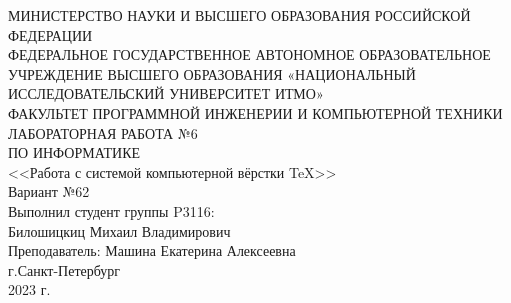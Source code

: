 \begin{titlepage}
    \centering
    \large МИНИСТЕРСТВО НАУКИ И ВЫСШЕГО ОБРАЗОВАНИЯ РОССИЙСКОЙ ФЕДЕРАЦИИ\\ФЕДЕРАЛЬНОЕ ГОСУДАРСТВЕННОЕ АВТОНОМНОЕ ОБРАЗОВАТЕЛЬНОЕ УЧРЕЖДЕНИЕ ВЫСШЕГО ОБРАЗОВАНИЯ «НАЦИОНАЛЬНЫЙ ИССЛЕДОВАТЕЛЬСКИЙ УНИВЕРСИТЕТ ИТМО»\\ФАКУЛЬТЕТ ПРОГРАММНОЙ ИНЖЕНЕРИИ И КОМПЬЮТЕРНОЙ ТЕХНИКИ\\
    \vspace*{\fill}
    \LARGE ЛАБОРАТОРНАЯ РАБОТА №6\\ПО ИНФОРМАТИКЕ\\<<Работа с системой компьютерной вёрстки \TeX>>\\Вариант №62\\
    \vspace{2cm}
    \raggedleft \large Выполнил студент группы P3116:\\Билошицкиц Михаил Владимирович\\Преподаватель: Машина Екатерина Алексеевна\\
    \vspace*{\fill}
    \centering
    \large г.Санкт-Петербург\\2023 г.
    \end{titlepage}